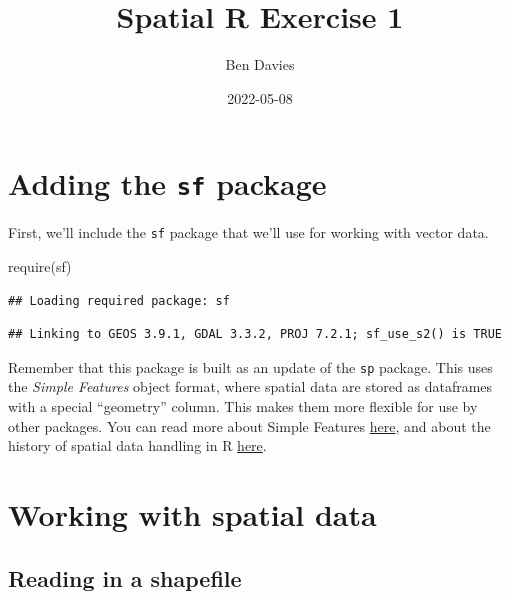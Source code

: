 \documentclass[
]{book}
\title{Spatial R Exercise 1}
\author{Ben Davies}
\date{2022-05-08}
\newenvironment{Shaded}{\begin{snugshade}}{\end{snugshade}}
\newcommand{\FunctionTok}[1]{\textcolor[rgb]{0.00,0.00,0.00}{#1}}
\newcommand{\NormalTok}[1]{#1}
\begin{document}
\maketitle

{
\setcounter{tocdepth}{1}
\tableofcontents
}
\hypertarget{adding-the-sf-package}{%
\chapter{\texorpdfstring{Adding the \texttt{sf} package}{Adding the sf package}}\label{adding-the-sf-package}}

First, we'll include the \texttt{sf} package that we'll use for working with vector data.

\begin{Shaded}
\begin{Highlighting}[]
\FunctionTok{require}\NormalTok{(sf)}
\end{Highlighting}
\end{Shaded}

\begin{verbatim}
## Loading required package: sf
\end{verbatim}

\begin{verbatim}
## Linking to GEOS 3.9.1, GDAL 3.3.2, PROJ 7.2.1; sf_use_s2() is TRUE
\end{verbatim}

Remember that this package is built as an update of the \texttt{sp} package. This uses the \emph{Simple Features} object format, where spatial data are stored as dataframes with a special ``geometry'' column. This makes them more flexible for use by other packages. You can read more about Simple Features \href{http://wiki.gis.com/wiki/index.php/Simple_Features}{here}, and about the history of spatial data handling in R \href{https://link.springer.com/article/10.1007/s10109-020-00336-0}{here}.

\hypertarget{working-with-spatial-data}{%
\chapter{Working with spatial data}\label{working-with-spatial-data}}

\hypertarget{reading-in-a-shapefile}{%
\section{Reading in a shapefile}\label{reading-in-a-shapefile}}
\end{document}
